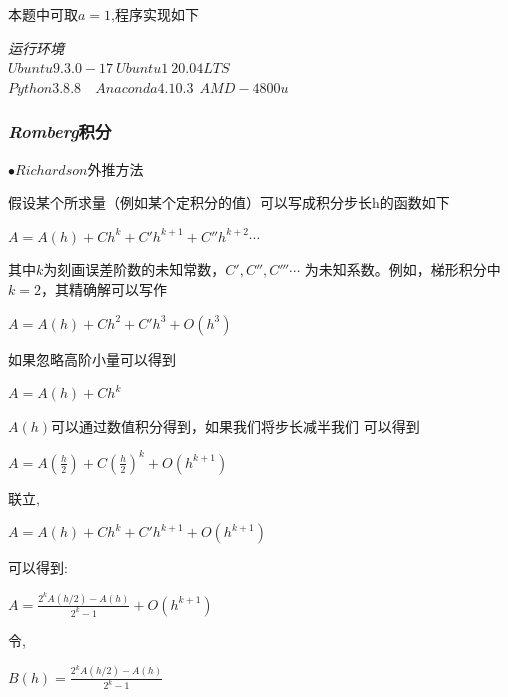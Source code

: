 \documentclass[11pt, a4paper, oneside]{ctexart}
\begin{document}
{{{    {本题中可取$a=1$,程序实现如下}

    {    \begin{flushright}
    \scriptsize\emph{运行环境\\$Ubuntu 9.3.0-17\ Ubuntu1~20.04LTS$}\\
    \scriptsize\emph{$Python 3.8.8$\ \ $Anaconda 4.10.3\ \  AMD-4800u$}
        
    \end{flushright}

    }


\subsubsection{\emph{Romberg}积分}
{
    {
    $\bullet Richardson$外推方法
    \par  假设某个所求量（例如某个定积分的值）可以写成积分步长h的函数如下
    \begin{center}
        $A=A(h)+ Ch^k + C'h^{k+1}+C''h^{k+2}\cdots$
    \end{center} 
    

    其中$k$为刻画误差阶数的未知常数，$C',C'',C'''\cdots$
    为未知系数。例如，梯形积分中$k=2$，其精确解可以写作
    \begin{center}
        $A=A(h)+ Ch^2 + C'h^3+O(h^{3})$
    \end{center} 
    
    
    如果忽略高阶小量可以得到
    \begin{center}
        $A=A(h)+ Ch^k $
    \end{center} 


    $A(h)$可以通过数值积分得到，如果我们将步长减半我们
    可以得到
    \begin{center}
        $A=A(\frac h2)+ C{(\frac h 2)}^k +O(h^{k+1})$
    \end{center} 


    联立,
    \begin{center}
        $A=A(h)+ Ch^k + C'h^{k+1}+O(h^{k+1})$
    \end{center} 

    可以得到:

    \begin{center}
        $A=\frac{2^kA(h/2)-A(h)}{2^k-1}+O(h^{k+1})$
    \end{center} 


    令,
    \begin{center}
        \large $B(h)=\frac{2^kA(h/2)-A(h)}{2^k-1}$
    \end{center} 

}}}}}
\end{document}
